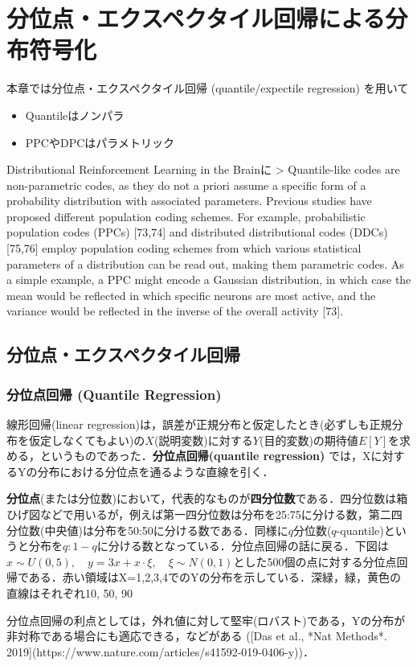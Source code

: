 \section{分位点・エクスペクタイル回帰による分布符号化}
本章では分位点・エクスペクタイル回帰 (quantile/expectile regression) を用いて

\begin{itemize}
\item Quantileはノンパラ
\item PPCやDPCはパラメトリック
\end{itemize}

Distributional Reinforcement Learning in the Brainに
> Quantile-like codes are non-parametric codes, as they do not a priori assume a specific form of a probability distribution with associated parameters. Previous studies have proposed different population coding schemes. For example, probabilistic population codes (PPCs) [73,74] and distributed distributional codes (DDCs) [75,76] employ population coding schemes from which various statistical parameters of a distribution can be read out, making them parametric codes. As a simple example, a PPC might encode a Gaussian distribution, in which case the mean would be reflected in which specific neurons are most active, and the variance would be reflected in the inverse of the overall activity [73].
\subsection{分位点・エクスペクタイル回帰}
\subsubsection{分位点回帰 (Quantile Regression)}
線形回帰(linear regression)は，誤差が正規分布と仮定したとき(必ずしも正規分布を仮定しなくてもよい)の$X$(説明変数)に対する$Y$(目的変数)の期待値$E[Y]$を求める，というものであった．\textbf{分位点回帰(quantile regression)} では，Xに対するYの分布における分位点を通るような直線を引く．

\textbf{分位点}(または分位数)において，代表的なものが\textbf{四分位数}である．四分位数は箱ひげ図などで用いるが，例えば第一四分位数は分布を25:75に分ける数，第二四分位数(中央値)は分布を50:50に分ける数である．同様に$q$分位数($q$-quantile)というと分布を$q:1-q$に分ける数となっている．分位点回帰の話に戻る．下図は$x\sim U(0, 5),\quad y=3x+x\cdot \xi,\quad \xi\sim N(0,1)$とした500個の点に対する分位点回帰である．赤い領域はX=1,2,3,4でのYの分布を示している．深緑，緑，黄色の直線はそれぞれ10, 50, 90%



分位点回帰の利点としては，外れ値に対して堅牢(ロバスト)である，Yの分布が非対称である場合にも適応できる，などがある ([Das et al., *Nat Methods*. 2019](https://www.nature.com/articles/s41592-019-0406-y))．
